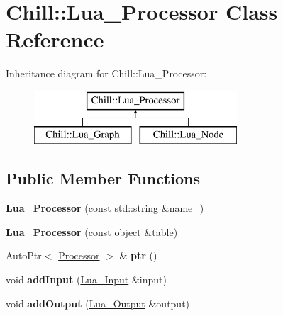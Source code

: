 \hypertarget{class_chill_1_1_lua___processor}{}\section{Chill\+:\+:Lua\+\_\+\+Processor Class Reference}
\label{class_chill_1_1_lua___processor}
Inheritance diagram for Chill\+:\+:Lua\+\_\+\+Processor\+:\begin{figure}[H]
\begin{center}
\leavevmode
\includegraphics[height=2.000000cm]{class_chill_1_1_lua___processor}
\end{center}
\end{figure}
\subsection*{Public Member Functions}
\begin{DoxyCompactItemize}
\item 
\mbox{\label{class_chill_1_1_lua___processor_a01aeb9acab82db2c119ae71ed5208d13}} 
{\bfseries Lua\+\_\+\+Processor} (const std\+::string \&name\+\_\+)
\item 
\mbox{\label{class_chill_1_1_lua___processor_a62874754d5193c80b899ce0d10f50a70}} 
{\bfseries Lua\+\_\+\+Processor} (const object \&table)
\item 
\mbox{\label{class_chill_1_1_lua___processor_add2a84a386196ed271e36afb7667b906}} 
Auto\+Ptr$<$ \mbox{\hyperlink{class_chill_1_1_processor}{Processor}} $>$ \& {\bfseries ptr} ()
\item 
\mbox{\label{class_chill_1_1_lua___processor_a24a38f10bc7055887f6cecf351c897f2}} 
void {\bfseries add\+Input} (\mbox{\hyperlink{class_chill_1_1_lua___input}{Lua\+\_\+\+Input}} \&input)
\item 
\mbox{\label{class_chill_1_1_lua___processor_a80681ff20414bb507f93f6b14a8a7f8a}} 
void {\bfseries add\+Output} (\mbox{\hyperlink{class_chill_1_1_lua___output}{Lua\+\_\+\+Output}} \&output)
\end{DoxyCompactItemize}
